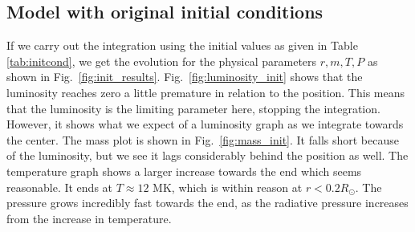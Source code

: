 \documentclass[a4paper, 11pt, english]{article}
\newcommand{\refig}[1]{\textcolor{blue}{\ref{fig:#1}}} %
\newcommand{\reftab}[1]{\textcolor{blue}{\ref{tab:#1}}} %
\begin{document}
\subsection{Model with original initial conditions}
If we carry out the integration using the initial values as given in Table
\reftab{initcond}, we get the evolution for the physical parameters \(r,m,T,P\) as shown
in Fig.~\refig{init_results}. Fig.~\refig{luminosity_init} shows that the luminosity
reaches zero a little premature in relation to the position. This means that the
luminosity is the limiting parameter here, stopping the integration.
However, it shows what we expect of a luminosity graph as we integrate towards the center.
The mass plot is shown in Fig.~\refig{mass_init}. It falls short because of the
luminosity, but we see it lags considerably behind the position as well. The temperature
graph shows a larger increase towards the end which seems reasonable. It ends at
$T \approx 12$ MK, which is within reason at $r < 0.2R_{\odot}$. The pressure grows
incredibly fast towards the end, as the radiative pressure increases from the increase in
temperature.
\end{document}
